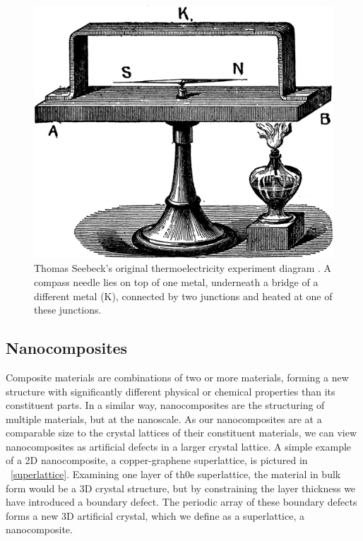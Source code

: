 \documentclass[12pt,draft]{article}
\newcommand{\figref}[2][\figurename~]{#1\ref{#2}}
\begin{document}
\begin{figure}
	\label{fig:seebeck-experiment}
	\centering
	\includegraphics[width=\textwidth]{seebeck-experiment-black.png}
	\caption{Thomas Seebeck's original thermoelectricity experiment diagram \cite{seebeck-original}. A compass needle lies on top of one metal, underneath a bridge of a different metal (K), connected by two junctions and heated at one of these junctions.}
\end{figure}

\subsection{Nanocomposites}
Composite materials are combinations of two or more materials, forming a new structure with significantly different physical or chemical properties than its constituent parts. In a similar way, nanocomposites are the structuring of multiple materials, but at the nanoscale. As our nanocomposites are at a comparable size to the crystal lattices of their constituent materials, we can view nanocomposites as artificial defects in a larger crystal lattice. A simple example of a 2D nanocomposite, a copper-graphene superlattice, is pictured in \figref{superlattice}. Examining one layer of th0e superlattice, the material in bulk form would be a 3D crystal structure, but by constraining the layer thickness we have introduced a boundary defect. The periodic array of these boundary defects forms a new 3D artificial crystal, which we define as a superlattice, a nanocomposite.
\end{document}
